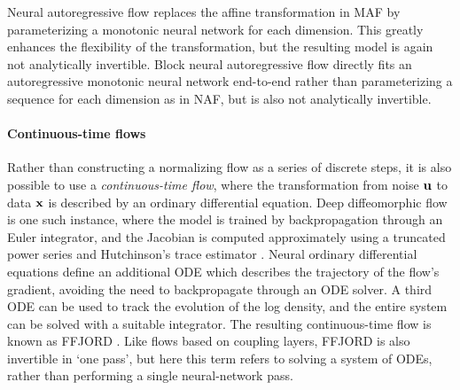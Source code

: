 Neural autoregressive flow \citep[NAF,][]{Huang:2018:naf} replaces the affine transformation in MAF by parameterizing a monotonic neural network for each dimension. 
This greatly enhances the flexibility of the transformation, but the resulting model is again not analytically invertible. 
Block neural autoregressive flow \citep[Block-NAF,][]{DeCao:2019:bnaf} directly fits an autoregressive monotonic neural network end-to-end rather than parameterizing a sequence for each dimension as in NAF, but is also not analytically invertible.

\paragraph{Continuous-time flows} 
Rather than constructing a normalizing flow as a series of discrete steps, it is also possible to use a \emph{continuous-time flow}, where the transformation from noise $\mathbf{u}$ to data $\mathbf{x}$ is described by an ordinary differential equation. 
Deep diffeomorphic flow \citep{Salman:2018:diffeomorphic} is one such instance, where the model is trained by backpropagation through an Euler integrator, and the Jacobian is computed approximately using a truncated power series and Hutchinson's trace estimator \citep{hutchinson:1990:trace}. 
Neural ordinary differential equations \citep[Neural ODEs,][]{Chen:2018:neural_odes} define an additional ODE which describes the trajectory of the flow's gradient, avoiding the need to backpropagate through an ODE solver. 
A third ODE can be used to track the evolution of the log density, and the entire system can be solved with a suitable integrator. 
The resulting continuous-time flow is known as FFJORD \citep{Grathwohl:2018:ffjord}. 
Like flows based on coupling layers, FFJORD is also invertible in `one pass', but here this term refers to solving a system of ODEs, rather than performing a single neural-network pass. 
